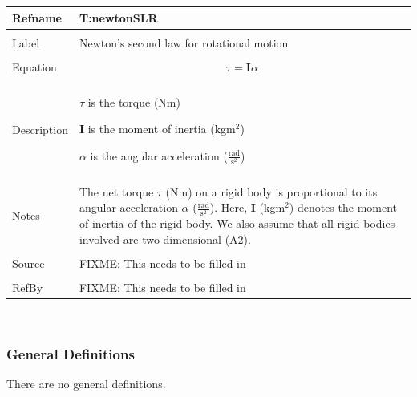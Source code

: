 \documentclass[12pt]{article}
\begin{document}
\noindent \begin{minipage}{\textwidth}
\begin{tabular}{p{} p{}}
\toprule \textbf{Refname} & \textbf{T:newtonSLR}
\label{T:newtonSLR}
\\ \midrule \\
Label & Newton's second law for rotational motion
\\ \midrule \\
Equation & \begin{dmath}
           τ=\mathbf{I} α
           \end{dmath}
\\ \midrule \\
Description & \begin{symbDescription}
              \item{$τ$ is the torque (Nm)}
              \item{$\mathbf{I}$ is the moment of inertia (kg$\text{m}^{2}$)}
              \item{$α$ is the angular acceleration ($\frac{\text{rad}}{\text{s}^{2}}$)}
              \end{symbDescription}
\\ \midrule \\
Notes & The net torque $τ$ (Nm) on a rigid body is proportional to its angular acceleration $α$ ($\frac{\text{rad}}{\text{s}^{2}}$). Here, $\mathbf{I}$ (kg$\text{m}^{2}$) denotes the moment of inertia of the rigid body. We also assume that all rigid bodies involved are two-dimensional (A2).
\\ \midrule \\
Source & FIXME: This needs to be filled in
\\ \midrule \\
RefBy & FIXME: This needs to be filled in
\\ \bottomrule \end{tabular}
\end{minipage}\\
\subsubsection{General Definitions}
\label{Sec:GDs}
There are no general definitions.
\end{document}
